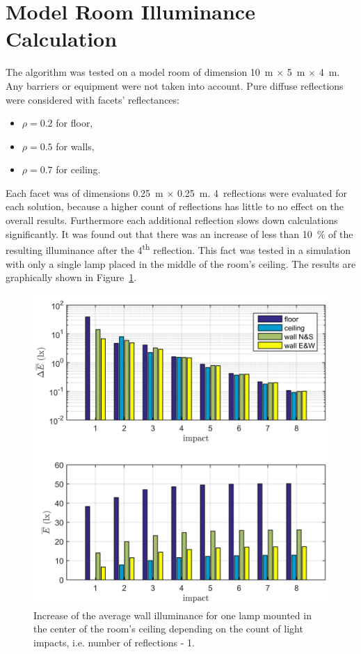 \section{Model Room Illuminance Calculation}
The algorithm was tested on a model room of dimension 10~m $\times$ 5~m $\times$ 4~m. Any barriers or equipment were not taken into account. Pure diffuse reflections were considered with facets' reflectances:

\begin{itemize}
	\item $\rho = 0.2$ for floor,
	\item $\rho = 0.5$ for walls,
	\item $\rho = 0.7$ for ceiling.
\end{itemize}

Each facet was of dimensions 0.25~m $\times$ 0.25~m. 4~reflections were evaluated for each solution, because a higher count of reflections has little to no effect on the overall results. Furthermore each additional reflection slows down calculations significantly. It was found out that there was an increase of less than 10~\% of the resulting illuminance after the 4\textsuperscript{th} reflection. This fact was tested in a simulation with only a single lamp placed in the middle of the room's ceiling. The results are graphically shown in Figure~\ref{fig:reflDif}.

\begin{figure}[htb]
  \centering
  \includegraphics[width=\columnwidth]{reflDif}
  \caption{Increase of the average wall illuminance for one lamp mounted in the center of the room's ceiling depending on the count of light impacts, i.e. number of reflections - 1.}
  \label{fig:reflDif}
\end{figure}

